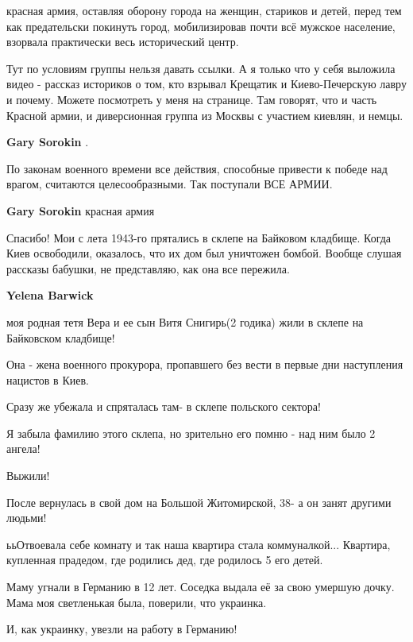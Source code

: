\begin{itemize}
\begin{itemize}
красная армия, оставляя оборону города на женщин, стариков и детей, перед тем
как предательски покинуть город, мобилизировав почти всё мужское население,
взорвала практически весь исторический центр.


Тут по условиям группы нельзя давать ссылки. А я только что у себя выложила
видео - рассказ историков о том, кто взрывал Крещатик и Киево-Печерскую лавру
и почему. Можете посмотреть у меня на странице. Там говорят, что и часть
Красной армии, и диверсионная группа из Москвы с участием киевлян, и немцы.

\textbf{Gary Sorokin} . 

По законам военного времени все действия, способные привести к победе над
врагом, считаются целесообразными. Так поступали ВСЕ АРМИИ.

\textbf{Gary Sorokin} красная армия
\end{itemize} %


Спасибо! Мои с лета 1943-го прятались в склепе на Байковом кладбище. Когда Киев
освободили, оказалось, что их дом был уничтожен бомбой. Вообще слушая рассказы
бабушки, не представляю, как она все пережила.

\begin{itemize} %
\textbf{Yelena Barwick} 

моя родная тетя Вера и ее сын Витя Снигирь(2 годика) жили в склепе на
Байковском кладбище!

Она - жена военного прокурора, пропавшего без вести в первые дни наступления
нацистов в Киев.

Сразу же убежала и спряталась там- в склепе польского сектора!

Я забыла фамилию этого склепа, но зрительно его помню - над ним было 2 ангела!

Выжили!

После вернулась в свой дом на Большой Житомирской, 38- а он занят другими
людьми!

ььОтвоевала себе комнату и так наша квартира стала коммуналкой... Квартира,
купленная прадедом, где родились дед, где родилось 5 его детей.

Маму угнали в Германию в 12 лет. Соседка выдала её за свою умершую дочку. Мама моя
светленькая была, поверили, что украинка.

И, как украинку, увезли на работу в Германию!


\end{itemize}
\end{itemize}

